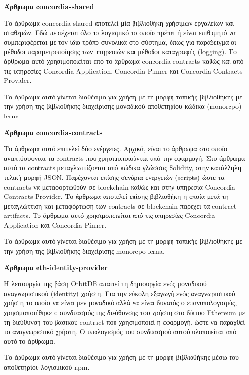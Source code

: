 \vspace{0.5cm}
\textbf{Άρθρωμα concordia-shared}

Το άρθρωμα concordia-shared αποτελεί μία βιβλιοθήκη χρήσιμων εργαλείων και σταθερών. Εδώ περιέχεται όλο το λογισμικό το οποίο πρέπει ή είναι επιθυμητό να συμπεριφέρεται με τον ίδιο τρόπο συνολικά στο σύστημα, όπως για παράδειγμα οι μέθοδοι παραμετροποίησης των υπηρεσιών και μέθοδοι καταγραφής (logging). Το άρθρωμα αυτό χρησιμοποιείται από το άρθρωμα concordia-contracts καθώς και από τις υπηρεσίες Concordia Application, Concordia Pinner και Concordia Contracts Provider.

Το άρθρωμα αυτό γίνεται διαθέσιμο για χρήση με τη μορφή τοπικής βιβλιοθήκης με την χρήση της βιβλιοθήκης διαχείρισης μοναδικού αποθετηρίου κώδικα (monorepo) lerna.

\vspace{0.5cm}
\textbf{Άρθρωμα concordia-contracts}

Το άρθρωμα αυτό επιτελεί δύο ενέργειες. Αρχικά, είναι το άρθρωμα στο οποίο αναπτύσσονται τα contracts που χρησιμοποιούνται από την εφαρμογή. Στο άρθρωμα αυτό τα contracts μεταγλωττίζονται από κώδικα γλώσσας Solidity, στην κατάλληλη τελική μορφή JSON. Παρέχονται επίσης σενάρια ενεργειών (scripts) ώστε τα contracts να μεταφορτωθούν σε blockchain καθώς και στην υπηρεσία Concordia Contracts Provider. Το άρθρωμα αποτελεί επίσης βιβλιοθήκη η οποία μετά τη μεταγλώττιση και μεταφόρτωση των contracts σε blockchain παρέχει τα contract artifacts. Το άρθρωμα αυτό χρησιμοποιείται από τις υπηρεσίες Concordia Application και Concordia Pinner.

Το άρθρωμα αυτό γίνεται διαθέσιμο για χρήση με τη μορφή τοπικής βιβλιοθήκης με την χρήση της βιβλιοθήκης διαχείρισης monorepo lerna.

\vspace{0.5cm}
\textbf{Άρθρωμα eth-identity-provider}

Η λειτουργία της βάση OrbitDB απαιτεί τη δημιουργία ενός μοναδικού αναγνωριστικού (identity) χρήστη. Για την εύκολη εξαγωγή ενός αναγνωριστικού χρήστη το οποίο να είναι μεν μοναδικό αλλά να είναι δυνατός ο επανυπολογισμός, χρησιμοποιήθηκε ο συνδυασμός της διεύθυνσης του χρήστη στο δίκτυο Ethereum με τη διεύθυνση του βασικού contract που χρησιμοποιεί η εφαρμογή, ώστε να παραχθεί το αναγνωριστικό χρήστη. Ο υπολογισμός του συνδυασμού αυτού υλοποιείται από αυτό το άρθρωμα.

Το άρθρωμα αυτό γίνεται διαθέσιμο για χρήση με τη μορφή βιβλιοθήκης μέσω του αποθετηρίου λογισμικού npm.

